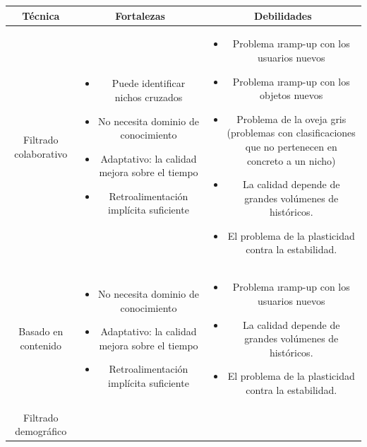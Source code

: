 \clearpage
\begin{table}[h]
	\begin{center}
		\begin{tabular}{| c | c | c |}
			\toprule
			\textbf{Técnica} & \textbf{Fortalezas} & \textbf{Debilidades} \\
			\midrule
			Filtrado colaborativo & 
			\parbox{5cm}{\begin{itemize}[topsep=0pt]
			\item Puede identificar nichos cruzados
			\item No necesita dominio de conocimiento
			\item Adaptativo: la calidad mejora sobre el tiempo
			\item Retroalimentación implícita suficiente
			\end{itemize}} &
			\parbox{5cm}{\begin{itemize}[topsep=0pt]
			\item Problema \i{ramp-up} con los usuarios nuevos
			\item Problema \i{ramp-up} con los objetos nuevos
			\item Problema de la oveja gris (problemas con clasificaciones que no pertenecen en concreto a un nicho)
			\item La calidad depende de grandes volúmenes de históricos.
			\item El problema de la plasticidad contra la estabilidad.
			\end{itemize}} \\
			\midrule
			Basado en contenido & 
			\parbox{5cm}{\begin{itemize}[topsep=0pt]
			\item No necesita dominio de conocimiento
			\item Adaptativo: la calidad mejora sobre el tiempo
			\item Retroalimentación implícita suficiente
			\end{itemize}} &
			\parbox{5cm}{\begin{itemize}[topsep=0pt]
			\item Problema \i{ramp-up} con los usuarios nuevos
			\item La calidad depende de grandes volúmenes de históricos.
			\item El problema de la plasticidad contra la estabilidad.
			\end{itemize}} \\
			\midrule
			Filtrado demográfico & 
			\parbox{5cm}{\begin{itemize}[topsep=0pt]

\end{itemize}}
\end{tabular}
\end{center}
\end{table}
